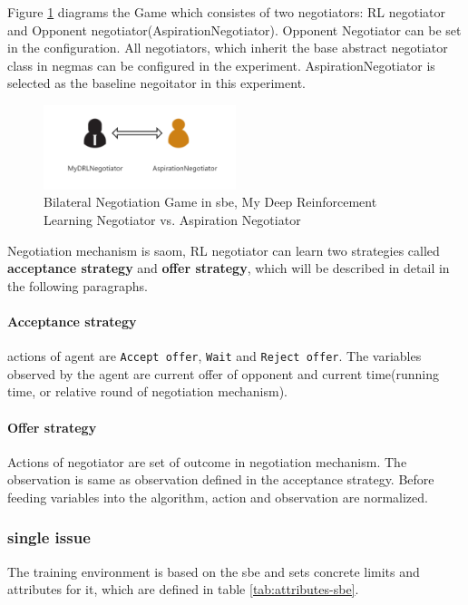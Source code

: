 Figure \ref{fig:bilateral-negotiation} diagrams the Game which consistes of two negotiators: RL negotiator and Opponent negotiator(AspirationNegotiator). Opponent Negotiator can be set in the configuration. All negotiators, which inherit the base abstract negotiator class in \gls{negmas} can be configured in the experiment. AspirationNegotiator is selected as the baseline negoitator in this experiment.

\begin{figure}[htbp]
\centering
\includegraphics[width=0.50\textwidth]{./images/bilateral-negotiation.png}
\caption{Bilateral Negotiation Game in \gls{sbe}, My Deep Reinforcement Learning Negotiator vs. Aspiration Negotiator}
\label{fig:bilateral-negotiation}
\end{figure}

Negotiation mechanism is \gls{saom}, RL negotiator can learn two strategies called \textbf{acceptance strategy} and \textbf{offer strategy}, which will be described in detail in the following paragraphs. 

\paragraph{Acceptance strategy} actions of agent are \texttt{Accept offer}, \texttt{Wait} and \texttt{Reject offer}. The variables observed by the agent are current offer of opponent and current time(running time, or relative round of negotiation mechanism).

\paragraph{Offer strategy} Actions of negotiator are set of outcome in negotiation mechanism. The observation is same as observation defined in the acceptance strategy. Before feeding variables into the algorithm, action and observation are normalized.

\subsubsection{single issue}
The training environment is based on the \gls{sbe} and sets concrete limits and attributes for it, which are defined in table \ref{tab:attributes-sbe}.

